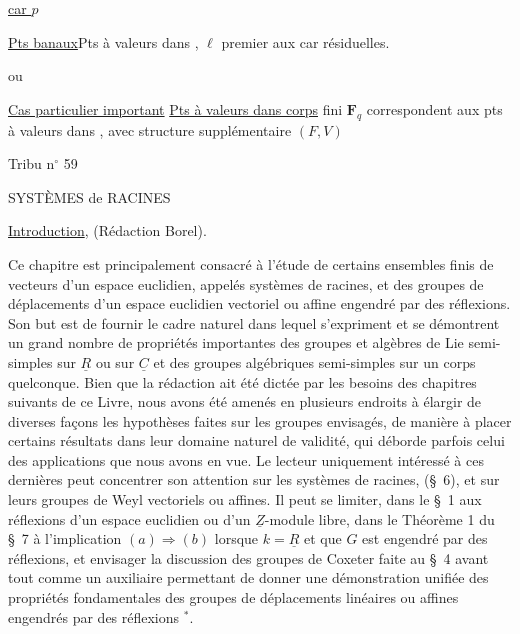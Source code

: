 \uline{ car $p$}

\uline{Pts banaux}\quad Pts à valeurs dans
,
$\ell$ premier aux car résiduelles.

\hfill ou

\uline{Cas particulier important}\quad
\uline{Pts à valeurs dans corps} fini $\mathbf F_q$ correspondent aux pts à valeurs dans
,
avec structure supplémentaire $(F,V)$

\hfill Tribu n$^\circ$ 59

\begin{center}SYSTÈMES de RACINES\end{center}

\begin{center}\uline{Introduction}, (Rédaction Borel).\end{center}

Ce chapitre est principalement consacré à l'étude de certains ensembles finis de vecteurs d'un espace euclidien, appelés systèmes de racines, et des groupes de déplacements d'un espace euclidien vectoriel ou affine engendré par des réflexions.
Son but est de fournir le cadre naturel dans lequel s'expriment et se démontrent un grand nombre de propriétés importantes des groupes et algèbres de Lie semi-simples sur $\underline{R}$ ou sur $\underline{C}$ et des groupes algébriques semi-simples sur un corps quelconque.
Bien que la rédaction ait été dictée par les besoins des chapitres suivants de ce Livre, nous avons été amenés en plusieurs endroits à élargir de diverses façons les hypothèses faites sur les groupes envisagés, de manière à placer certains résultats dans leur domaine naturel de validité, qui déborde parfois celui des applications que nous avons en vue.
Le lecteur uniquement intéressé à ces dernières peut concentrer son attention sur les systèmes de racines, (\S\ 6), et sur leurs groupes de Weyl vectoriels ou affines.
Il peut se limiter, dans le \S\ 1 aux réflexions d'un espace euclidien ou d'un $\underline{Z}$-module libre, dans le Théorème 1 du \S\ 7 à l'implication $(a)\Longrightarrow(b)$ lorsque $k=\underline{R}$ et que $G$ est engendré par des réflexions, et envisager la discussion des groupes de Coxeter faite au \S\ 4 avant tout comme un auxiliaire permettant de donner une démonstration unifiée des propriétés fondamentales des groupes de déplacements linéaires ou affines engendrés par des réflexions $^*$.

